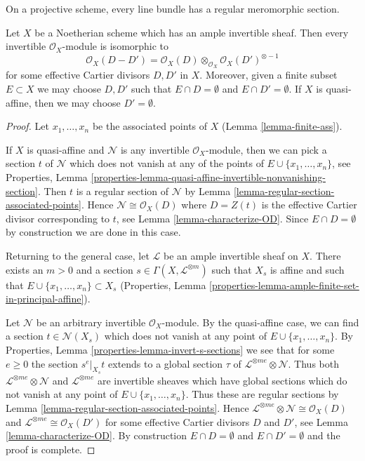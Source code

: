 \begin{lemma}
\label{lemma-quasi-projective-Noetherian-pic-effective-Cartier}
\begin{slogan}
On a projective scheme, every line bundle has a regular meromorphic section.
\end{slogan}
Let $X$ be a Noetherian scheme which has an ample invertible sheaf.
Then every invertible $\mathcal{O}_X$-module is isomorphic to
$$
\mathcal{O}_X(D - D') =
\mathcal{O}_X(D) \otimes_{\mathcal{O}_X} \mathcal{O}_X(D')^{\otimes -1}
$$
for some effective Cartier divisors $D, D'$ in $X$. Moreover, given a
finite subset $E \subset X$ we may choose $D, D'$ such that
$E \cap D = \emptyset$ and $E \cap D' = \emptyset$. If
$X$ is quasi-affine, then we may choose $D' = \emptyset$.
\end{lemma}

\begin{proof}
Let $x_1, \ldots, x_n$ be the associated points of $X$
(Lemma \ref{lemma-finite-ass}).

\medskip\noindent
If $X$ is quasi-affine and $\mathcal{N}$ is any invertible
$\mathcal{O}_X$-module, then we can pick a section $t$ of
$\mathcal{N}$ which does not vanish at any of the points
of $E \cup \{x_1, \ldots, x_n\}$, see Properties, Lemma
\ref{properties-lemma-quasi-affine-invertible-nonvanishing-section}.
Then $t$ is a regular section of $\mathcal{N}$ by
Lemma \ref{lemma-regular-section-associated-points}.
Hence $\mathcal{N} \cong \mathcal{O}_X(D)$ where
$D = Z(t)$ is the effective Cartier divisor corresponding to $t$, see
Lemma \ref{lemma-characterize-OD}. Since $E \cap D = \emptyset$
by construction we are done in this case.

\medskip\noindent
Returning to the general case, let $\mathcal{L}$ be an ample invertible sheaf
on $X$. There exists an $m > 0$ and a section
$s \in \Gamma(X, \mathcal{L}^{\otimes m})$ such that $X_s$
is affine and such that $E \cup \{x_1, \ldots, x_n\} \subset X_s$
(Properties, Lemma \ref{properties-lemma-ample-finite-set-in-principal-affine}).

\medskip\noindent
Let $\mathcal{N}$ be an arbitrary invertible $\mathcal{O}_X$-module.
By the quasi-affine case, we can find a section
$t \in \mathcal{N}(X_s)$ which does not vanish at any point
of $E \cup \{x_1, \ldots, x_n\}$.
By Properties, Lemma \ref{properties-lemma-invert-s-sections}
we see that for some $e \geq 0$ the section $s^e|_{X_s} t$ extends to
a global section $\tau$ of $\mathcal{L}^{\otimes me} \otimes \mathcal{N}$.
Thus both $\mathcal{L}^{\otimes me} \otimes \mathcal{N}$ and
$\mathcal{L}^{\otimes me}$ are invertible sheaves which have global sections
which do not vanish at any point of $E \cup \{x_1, \ldots, x_n\}$.
Thus these are regular sections by
Lemma \ref{lemma-regular-section-associated-points}.
Hence $\mathcal{L}^{\otimes me} \otimes \mathcal{N} \cong \mathcal{O}_X(D)$
and $\mathcal{L}^{\otimes me} \cong \mathcal{O}_X(D')$ for some
effective Cartier divisors $D$ and $D'$, see Lemma \ref{lemma-characterize-OD}.
By construction $E \cap D = \emptyset$ and $E \cap D' = \emptyset$
and the proof is complete.
\end{proof}

